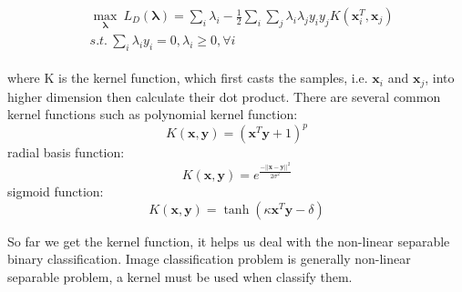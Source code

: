 \begin{align}
\begin{split}
&\max_\mathbf{\lambda} \ L_D(\mathbf{\lambda}) = \sum_i\lambda_i - \frac{1}{2} \sum_i\sum_j\lambda_i\lambda_jy_iy_j K(\mathbf{x}_i^T, \mathbf{x}_j )\\
 &s.t. \ \sum_i\lambda_iy_i = 0, \lambda_i \geq 0, \forall i
\label{eq:svm:dl3}
\end{split}
\end{align}

where K is the kernel function, which first casts the samples, i.e. $\mathbf{x}_i $ and $ \mathbf{x}_j$, into higher dimension then calculate their dot product.
There are several common kernel functions such as polynomial kernel function: 
$$K(\mathbf{x}, \mathbf{y}) = (\mathbf{x}^T\mathbf{y} + 1) ^ p$$
radial basis function:
$$K(\mathbf{x}, \mathbf{y}) = e ^\frac{- ||\mathbf{x} -\mathbf{y}||^2}{2\sigma^2}$$
sigmoid function:
$$K(\mathbf{x}, \mathbf{y}) = \tanh(\kappa \mathbf{x}^T\mathbf{y} - \delta)$$

So far we get the kernel function, it helps us deal with the non-linear separable binary classification.
Image classification problem is generally non-linear separable problem, a kernel must be used when classify them.